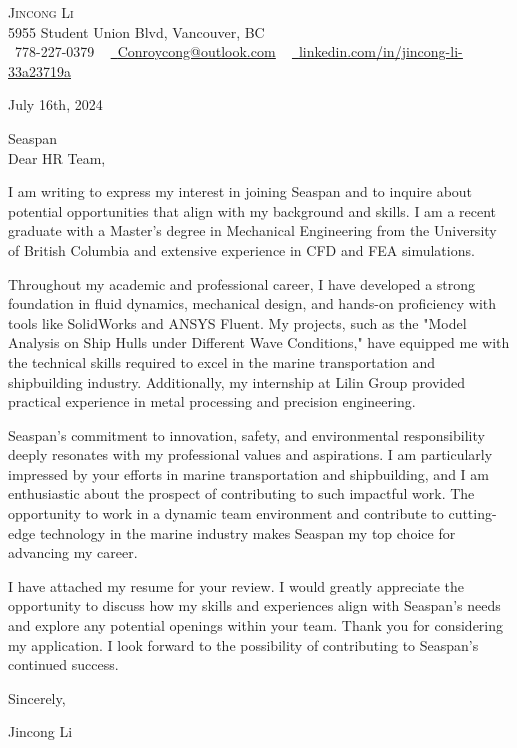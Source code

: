 \documentclass[letterpaper,11pt]{article}
\begin{document}
\begin{center}
    {\Huge \scshape Jincong Li} \\ \vspace{1pt}
    5955 Student Union Blvd, Vancouver, BC \\ \vspace{1pt}
    \small \raisebox{-0.1\height}\faPhone\ 778-227-0379 ~ \href{mailto:Conroycong@outlook.com}{\raisebox{-0.2\height}\faEnvelope\ \underline{Conroycong@outlook.com}} ~ 
    \href{https://linkedin.com/in/jincong-li-33a23719a/}{\raisebox{-0.2\height}\faLinkedin\ \underline{linkedin.com/in/jincong-li-33a23719a}}  ~
    \vspace{-8pt}
\end{center}

\begin{flushright}
July 16th, 2024 \\
\end{flushright}

Seaspan \\

Dear HR Team, 

I am writing to express my interest in joining Seaspan and to inquire about potential opportunities that align with my background and skills. I am a recent graduate with a Master’s degree in Mechanical Engineering from the University of British Columbia and extensive experience in CFD and FEA simulations.

Throughout my academic and professional career, I have developed a strong foundation in fluid dynamics, mechanical design, and hands-on proficiency with tools like SolidWorks and ANSYS Fluent. My projects, such as the "Model Analysis on Ship Hulls under Different Wave Conditions," have equipped me with the technical skills required to excel in the marine transportation and shipbuilding industry. Additionally, my internship at Lilin Group provided practical experience in metal processing and precision engineering.

Seaspan’s commitment to innovation, safety, and environmental responsibility deeply resonates with my professional values and aspirations. I am particularly impressed by your efforts in marine transportation and shipbuilding, and I am enthusiastic about the prospect of contributing to such impactful work. The opportunity to work in a dynamic team environment and contribute to cutting-edge technology in the marine industry makes Seaspan my top choice for advancing my career.

I have attached my resume for your review. I would greatly appreciate the opportunity to discuss how my skills and experiences align with Seaspan’s needs and explore any potential openings within your team. Thank you for considering my application. I look forward to the possibility of contributing to Seaspan’s continued success.

Sincerely,

Jincong Li
\end{document}
